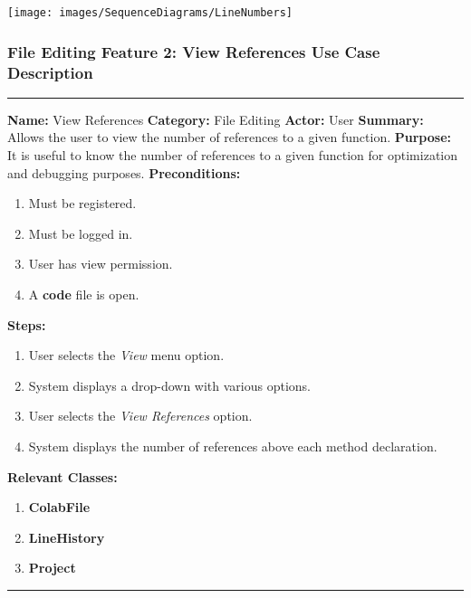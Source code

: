 \documentclass[twoside,letterpaper]{article}
\begin{document}
\bigskip

\texttt{[image: images/SequenceDiagrams/LineNumbers]}

\newpage

\subsubsection[File Editing Feature 2: View References]{\rmfamily\bfseries\color{black}
	File Editing Feature 2: View References Use Case Description}
\hypertarget{RefHeading22059017292}{}

\vspace{2pt}
\hrule
\vspace{8pt}
	\noindent\textbf{Name:} View References \newline
	\noindent\textbf{Category:} File Editing \newline
	\noindent\textbf{Actor:} User \newline
	\noindent\textbf{Summary:} Allows the user to view the number of references to a given function. \newline
	\noindent\textbf{Purpose:} It is useful to know the number of references to a given function for optimization and debugging purposes. \newline
	\noindent\textbf{Preconditions:}
	\begin{enumerate}
		\item Must be registered.
		\item Must be logged in.
		\item User has view permission.
		\item A \textbf{code} file is open.
	\end{enumerate}
	\noindent\textbf{Steps:}
	\begin{enumerate}
		\item User selects the \textit{View} menu option.
		\item System displays a drop-down with various options.
		\item User selects the \textit{View References} option.
		\item System displays the number of references above each method declaration.
	\end{enumerate}
	\noindent\textbf{Relevant Classes:}
	\begin{enumerate}
		\item \textbf {ColabFile}
		\item \textbf {LineHistory}
		\item \textbf {Project}
	\end{enumerate}
\vspace{8pt}
\hrule
\newpage
\end{document}
